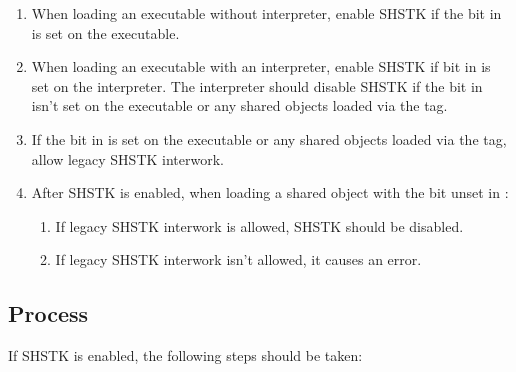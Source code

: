 \begin{enumerate}
  \item
    \begin{sloppypar}
      When loading an executable without interpreter, enable SHSTK if
      the  bit in
       is set on the executable.
    \end{sloppypar}
  \item
    \begin{sloppypar}
      When loading an executable with an interpreter, enable SHSTK if
       bit in
       is set on the interpreter.
      The interpreter should disable SHSTK if the
       bit in
       isn't set on the executable
      or any shared objects loaded via the  tag.
    \end{sloppypar}
   \item If the  bit in
      is set on the
     executable or any shared objects loaded via the
      tag, allow legacy SHSTK interwork.
  \item
    \begin{sloppypar}
      After SHSTK is enabled, when loading a shared object with the
       bit unset in
      :
    \end{sloppypar}
    \begin{enumerate}
      \item If legacy SHSTK interwork is allowed, SHSTK should be
        disabled.
      \item If legacy SHSTK interwork isn't allowed, it causes an
        error.
    \end{enumerate}
\end{enumerate}

\subsection{Process }
\label{wrss}

If SHSTK is enabled, the following steps should be taken:


